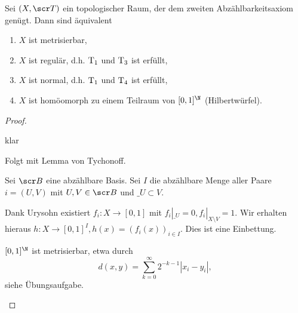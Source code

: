 \begin{st}
	Sei $(X, \scr T)$ ein topologischer Raum, der dem zweiten Abzählbarkeitsaxiom genügt.
	Dann sind äquivalent
	\begin{enumerate}[1)]
		\item
			$X$ ist metrisierbar,
		\item
			$X$ ist regulär, d.h. $\mathrm{T_{1}}$ und $\mathrm{T_{3}}$ ist erfüllt,
		\item
			$X$ ist normal, d.h. $\mathrm{T_{1}}$ und $\mathrm{T_{4}}$ ist erfüllt,
		\item
			$X$ ist homöomorph zu einem Teilraum von $[0,1]^\N$ (Hilbertwürfel).
	\end{enumerate}
	\begin{proof}
		\begin{segnb}[„(1)$\implies$(2)“]
			klar
		\end{segnb}
		\begin{segnb}[„(2)$\implies$(3)“]
			Folgt mit Lemma von Tychonoff. %
		\end{segnb}
		\begin{segnb}[„(3)$\implies$(4)“]
			Sei $\scr B$ eine abzählbare Basis.
			Sei $I$ die abzählbare Menge aller Paare $i = (U,V)$ mit $U,V \in \scr B$ und $\_U \subset V$.

			Dank Urysohn existiert $f_i: X \to [0,1]$ mit $f_i|_{\_U} = 0, f_i|_{X \setminus V} = 1$.
			Wir erhalten hieraus $h: X \to [0,1]^I, h(x) = (f_i(x))_{i \in I}$.
			Dies ist eine Einbettung.
		\end{segnb}
		\begin{segnb}[„(4)$\implies$(1)“]
			$[0,1]^\N$ ist metrisierbar, etwa durch
			\[
				d(x,y) = \sum_{k=0}^\infty 2^{-k-1} |x_i - y_i|,
			\]
			siehe Übungsaufgabe. %
		\end{segnb}
	\end{proof}
\end{st}
